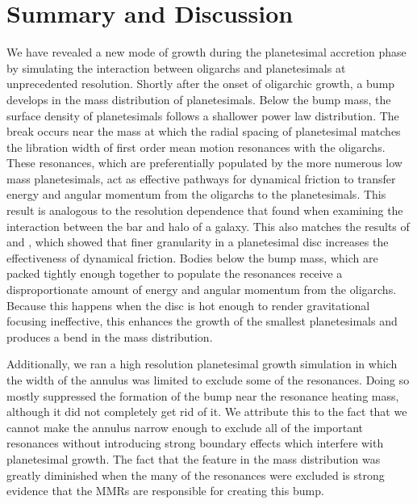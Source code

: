 \section{Summary and Discussion} \label{sec:discussion}

We have revealed a new mode of growth during the planetesimal accretion phase by simulating the interaction between 
oligarchs and planetesimals at unprecedented resolution. Shortly after the onset of oligarchic growth, a bump develops in the 
mass distribution of planetesimals. Below the bump mass, the surface density of planetesimals follows a shallower power law 
distribution. The break occurs near the mass at which the radial spacing of planetesimal matches the libration width of first order 
mean motion resonances with the oligarchs. These resonances, which are preferentially populated by the more numerous low 
mass planetesimals, act as effective pathways for dynamical friction to transfer energy and angular momentum from the 
oligarchs to the planetesimals. This result is analogous to the resolution dependence that \cite{weinberg07a, weinberg07b} 
found when examining the interaction between the bar and halo of a galaxy. This also matches the results of \cite{obrien06} and 
\cite{cionco02}, which showed that finer granularity in a planetesimal disc increases the effectiveness of dynamical friction. 
Bodies below the bump mass, which are packed tightly enough together to populate the resonances receive a disproportionate 
amount of energy and angular momentum from the oligarchs. Because this happens when the disc is hot enough to render 
gravitational focusing ineffective, this enhances the growth of the smallest planetesimals and produces a bend in the mass 
distribution.

Additionally, we ran a high resolution planetesimal growth simulation in which the width of the annulus was limited to exclude 
some of the resonances. Doing so mostly suppressed the formation of the bump near the resonance heating mass, although it 
did not completely get rid of it. We attribute this to the fact that we cannot make the annulus narrow enough to exclude all of the 
important resonances without introducing strong boundary effects which interfere with planetesimal growth. The fact that the 
feature in the mass distribution was greatly diminished when the many of the resonances were excluded is strong evidence that 
the MMRs are responsible for creating this bump.

